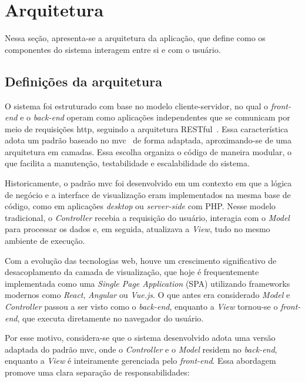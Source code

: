 \section{Arquitetura}

Nessa seção, apresenta-se a arquitetura da aplicação, que define como os componentes do sistema interagem entre si e com o usuário.

\subsection{Definições da arquitetura}

O sistema foi estruturado com base no modelo cliente-servidor, no qual o \emph{front-end} e o \emph{back-end} operam como aplicações independentes que se comunicam por meio de requisições \gls{http}, seguindo a arquitetura RESTful~\cite{RESTArch}. Essa característica adota um padrão baseado no \gls{mvc}~\cite{MDNMVC} de forma adaptada, aproximando-se de uma arquitetura em camadas. Essa escolha organiza o código de maneira modular, o que facilita a manutenção, testabilidade e escalabilidade do sistema.

Historicamente, o padrão \gls{mvc} foi desenvolvido em um contexto em que a lógica de negócio e a interface de visualização eram implementados na mesma base de código, como em aplicações \emph{desktop} ou \emph{server-side} com PHP. Nesse modelo tradicional, o \emph{Controller} recebia a requisição do usuário, interagia com o \emph{Model} para processar os dados e, em seguida, atualizava a \emph{View}, tudo no mesmo ambiente de execução.

Com a evolução das tecnologias web, houve um crescimento significativo de desacoplamento da camada de visualização, que hoje é frequentemente implementada como uma \emph{Single Page Application} (SPA) utilizando frameworks modernos como \emph{React}, \emph{Angular} ou \emph{Vue.js}. O que antes era considerado \emph{Model} e \emph{Controller} passou a ser visto como o \emph{back-end}, enquanto a \emph{View} tornou-se o \emph{front-end}, que executa diretamente no navegador do usuário.

Por esse motivo, considera-se que o sistema desenvolvido adota uma versão adaptada do padrão \gls{mvc}, onde o \emph{Controller} e o \emph{Model} residem no \emph{back-end}, enquanto a \emph{View} é inteiramente gerenciada pelo \emph{front-end}. Essa abordagem promove uma clara separação de responsabilidades:

